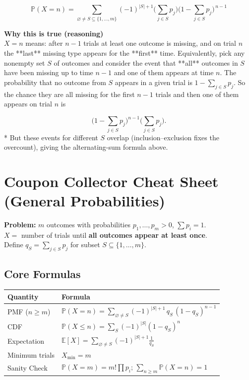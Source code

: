 \documentclass{book}
\begin{document}
$$
\boxed{\;\mathbb{P}(X=n)=\sum_{\varnothing\neq S\subseteq\{1,\dots,m\}}
(-1)^{|S|+1}\Big(\sum_{j\in S}p_j\Big)\Big(1-\sum_{j\in S}p_j\Big)^{\,n-1}\;}
$$

\textbf{Why this is true (reasoning)}\\

$X=n$ means: after $n-1$ trials at least one outcome is missing, and on trial $n$ the **last** missing type appears for the **first** time. Equivalently, pick any nonempty set $S$ of outcomes and consider the event that **all** outcomes in $S$ have been missing up to time $n-1$ and one of them appears at time $n$. The probability that no outcome from $S$ appears in a given trial is $1-\sum_{j\in S}p_j$. So the chance they are all missing for the first $n-1$ trials and then one of them appears on trial $n$ is

  $$
  \Big(1-\sum_{j\in S}p_j\Big)^{n-1}\Big(\sum_{j\in S}p_j\Big).
  $$
* But these events for different $S$ overlap (inclusion–exclusion fixes the overcount), giving the alternating-sum formula above.


\section*{Coupon Collector Cheat Sheet (General Probabilities)}
\textbf{Problem:} $m$ outcomes with probabilities $p_1,\dots,p_m>0$, $\sum p_i=1$.\\
$X =$ number of trials until \textbf{all outcomes appear at least once}.\\
Define $q_S = \sum_{j\in S} p_j$ for subset $S \subseteq \{1,\dots,m\}$.

\subsection*{Core Formulas}
\begin{tabular}{@{}ll@{}}
\toprule
\textbf{Quantity} & \textbf{Formula} \\
\midrule
PMF ($n\ge m$) & $\displaystyle \mathbb P(X=n)=\sum_{\varnothing\neq S}(-1)^{|S|+1}\,q_S\,(1-q_S)^{n-1}$ \\
CDF & $\displaystyle \mathbb P(X\le n)=\sum_{S}(-1)^{|S|}(1-q_S)^n$ \\
Expectation & $\displaystyle \mathbb E[X]=\sum_{\varnothing\neq S}(-1)^{|S|+1}\frac{1}{q_S}$ \\
Minimum trials & $X_{\min}=m$ \\
Sanity Check & $\mathbb P(X=m)=m!\prod p_i$; $\sum_{n\ge m} \mathbb P(X=n)=1$ \\
\bottomrule
\end{tabular}
\end{document}
